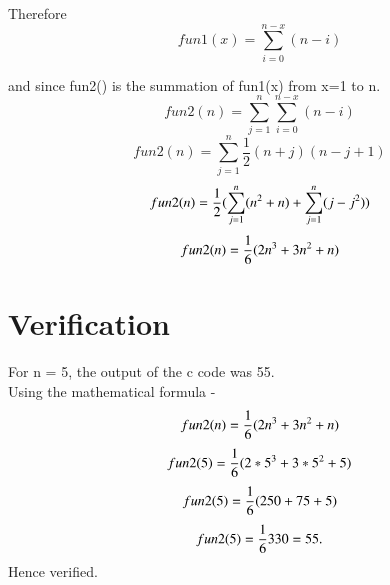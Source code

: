 \documentclass[journal,12pt,twocolumn]{IEEEtran}
\begin{document}
Therefore
\begin{equation*}
fun1(x) = \sum_{i=0}^{n-x} (n-i)
\end{equation*}

and since fun2() is the summation of fun1(x) from x=1 to n.\\
\begin{equation*}
fun2(n) = \sum_{j=1}^{n} \sum_{i=0}^{n-x} (n-i)
\end{equation*}
\begin{equation*}
fun2(n) = \sum_{j=1}^{n} \frac{1}{2}(n+j)(n-j+1)
\end{equation*}
\begin{equation*}
fun2(n) = \frac{1}{2} (\sum_{j=1}^{n} (n\textsuperscript{2} + n) + \sum_{j=1}^{n} (j - j\textsuperscript{2}) )
\end{equation*}
\begin{equation*}
fun2(n) = \frac{1}{6} (2n\textsuperscript{3} + 3n\textsuperscript{2} + n)
\end{equation*}


\section{Verification} 
For n = 5, the output of the c code was 55.\\
Using the mathematical formula -
\begin{equation*}
fun2(n) = \frac{1}{6} (2n\textsuperscript{3} + 3n\textsuperscript{2} + n)
\end{equation*}
\begin{equation*}
fun2(5) = \frac{1}{6} (2*5\textsuperscript{3} + 3*5\textsuperscript{2} + 5) \\
\end{equation*}
\begin{equation*}
fun2(5) = \frac{1}{6} (250 + 75 +5) \\
\end{equation*}
\begin{equation*}
fun2(5) = \frac{1}{6} 330 = 55.\\
\end{equation*}
Hence verified.
\end{document}
